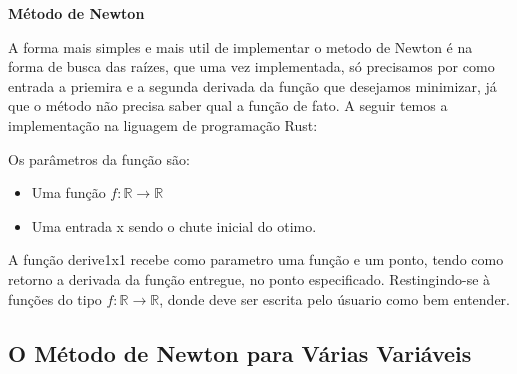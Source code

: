 \hspace{0.8cm}

\textbf{Método de Newton}

A forma mais simples e mais util de implementar o metodo de Newton é na forma
de busca das raízes, que uma vez  implementada, só precisamos por como entrada
a priemira e a segunda derivada da função que desejamos minimizar, já que o
método não precisa saber qual a função de fato. A seguir temos a implementação
na liguagem de programação Rust:



Os parâmetros da função são:

    \begin{itemize}
            \item Uma função \(f : \mathbb{R} \rightarrow \mathbb{R}\)
            \item Uma entrada x sendo o chute inicial do otimo.
    \end{itemize}


A função derive1x1 recebe como parametro uma função e um ponto, tendo como
retorno a derivada da função entregue, no ponto especificado. Restingindo-se
à funções do tipo \(f : \mathbb{R} \rightarrow \mathbb{R}\), donde deve ser
escrita pelo úsuario como bem entender.



\textcolor[rgb]{1,0,0}{\section{{O Método de Newton para Várias Variáveis}}}
